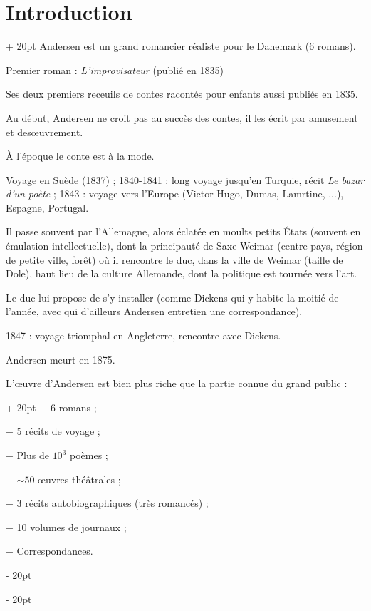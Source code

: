 \documentclass[a4paper, 12pt, twoside]{article}
\newcommand{\ind}[1][20pt]{\advance\leftskip + #1}
\newcommand{\deind}[1][20pt]{\advance\leftskip - #1}
\newenvironment{indt}[2][20pt]{#2 \par \ind[#1]}{\par \deind} %
\begin{document}
\begin{indt}{\section*{Introduction}}
        Andersen est un grand romancier réaliste pour le Danemark (6 romans).
        
        Premier roman : \textit{L'improvisateur} (publié en 1835)
        
        Ses deux premiers receuils de contes racontés pour enfants aussi publiés en 1835.
        
        Au début, Andersen ne croit pas au succès des contes, il les écrit par amusement et des\oe uvrement.
        
        \`A l'époque le conte est à la mode.
        
        Voyage en Suède (1837) ;
        1840-1841 : long voyage jusqu'en Turquie, récit \textit{Le bazar d'un poète} ;
        1843 : voyage vers l'Europe (Victor Hugo, Dumas, Lamrtine, ...), Espagne, Portugal.
        
        Il passe souvent par l'Allemagne, alors éclatée en moults petits \'Etats (souvent en émulation intellectuelle), dont la principauté de Saxe-Weimar (centre pays, région de petite ville, forêt) où il rencontre le duc, dans la ville de Weimar (taille de Dole), haut lieu de la culture Allemande, dont la politique est tournée vers l'art.
        
        Le duc lui propose de s'y installer (comme Dickens qui y habite la moitié de l'année, avec qui d'ailleurs Andersen entretien une correspondance).
        
        1847 : voyage triomphal en Angleterre, rencontre avec Dickens.
        
        Andersen meurt en 1875.
        
        \vspace{12pt}
        
        \begin{indt}{L'\oe uvre d'Andersen est bien plus riche que la partie connue du grand public :}
            $-$ 6 romans ;
            
            $-$ 5 récits de voyage ;
            
            $-$ Plus de $10^3$ poèmes ;
            
            $-$ $\sim 50$ \oe uvres théâtrales ;
            
            $-$ 3 récits autobiographiques (très romancés) ;
            
            $-$ 10 volumes de journaux ;
            
            $-$ Correspondances.
        \end{indt}
        

\end{indt}
\end{document}
